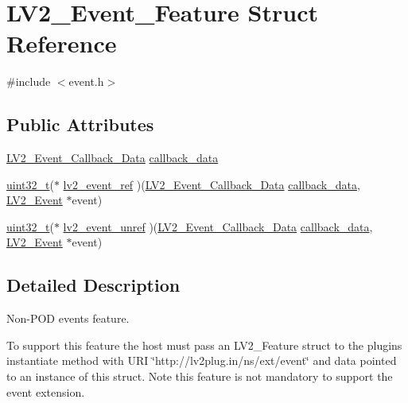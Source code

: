 \hypertarget{struct_l_v2___event___feature}{}\section{L\+V2\+\_\+\+Event\+\_\+\+Feature Struct Reference}
\label{struct_l_v2___event___feature}


{\ttfamily \#include $<$event.\+h$>$}

\subsection*{Public Attributes}
\begin{DoxyCompactItemize}
\item 
\hyperlink{event_8h_a63cb077a38b841faaf5a4d6803a5a8f9}{L\+V2\+\_\+\+Event\+\_\+\+Callback\+\_\+\+Data} \hyperlink{struct_l_v2___event___feature_a18b4fda679c0a9ea932dd3a5828686e1}{callback\+\_\+data}
\item 
\hyperlink{lib-src_2ffmpeg_2win32_2stdint_8h_a6eb1e68cc391dd753bc8ce896dbb8315}{uint32\+\_\+t}($\ast$ \hyperlink{struct_l_v2___event___feature_a2ecce5a44b5ebf4af4a0edde874e183d}{lv2\+\_\+event\+\_\+ref} )(\hyperlink{event_8h_a63cb077a38b841faaf5a4d6803a5a8f9}{L\+V2\+\_\+\+Event\+\_\+\+Callback\+\_\+\+Data} \hyperlink{struct_l_v2___event___feature_a18b4fda679c0a9ea932dd3a5828686e1}{callback\+\_\+data}, \hyperlink{struct_l_v2___event}{L\+V2\+\_\+\+Event} $\ast$event)
\item 
\hyperlink{lib-src_2ffmpeg_2win32_2stdint_8h_a6eb1e68cc391dd753bc8ce896dbb8315}{uint32\+\_\+t}($\ast$ \hyperlink{struct_l_v2___event___feature_a91a3e8d1e71ae094e63863ad885dc10d}{lv2\+\_\+event\+\_\+unref} )(\hyperlink{event_8h_a63cb077a38b841faaf5a4d6803a5a8f9}{L\+V2\+\_\+\+Event\+\_\+\+Callback\+\_\+\+Data} \hyperlink{struct_l_v2___event___feature_a18b4fda679c0a9ea932dd3a5828686e1}{callback\+\_\+data}, \hyperlink{struct_l_v2___event}{L\+V2\+\_\+\+Event} $\ast$event)
\end{DoxyCompactItemize}


\subsection{Detailed Description}
Non-\/\+P\+OD events feature.

To support this feature the host must pass an L\+V2\+\_\+\+Feature struct to the plugin\textquotesingle{}s instantiate method with U\+RI \char`\"{}http\+://lv2plug.\+in/ns/ext/event\char`\"{} and data pointed to an instance of this struct. Note this feature is not mandatory to support the event extension. 

